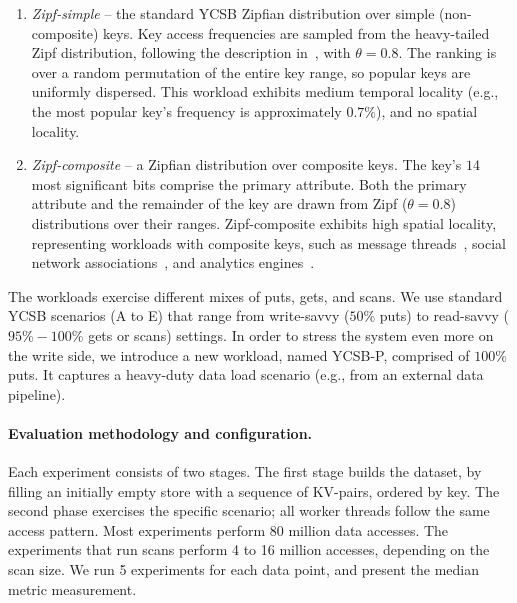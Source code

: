 \begin{enumerate}
\item {\em Zipf-simple} -- the standard YCSB Zipfian distribution over simple (non-composite) keys. 
Key access frequencies are sampled from the heavy-tailed Zipf distribution, 
following the description in~\cite{Gray:1994:QGB:191839.191886}, with $\theta = 0.8$. 
The ranking is over a random permutation of the entire key range, so popular keys are uniformly dispersed.
This workload exhibits 
medium temporal locality (e.g., the most popular key's frequency is approximately $0.7\%$), 
and no spatial locality. 

\item {\em Zipf-composite}  -- a Zipfian distribution over composite keys. 
The key's $14$ most significant bits comprise the primary attribute. Both the primary attribute and 
the remainder of the key are drawn from Zipf ($\theta=0.8$) distributions over their ranges. 
Zipf-composite exhibits high spatial locality, representing workloads 
with composite keys, such as message threads~\cite{Borthakur:2011:AHG:1989323.1989438},
social network associations~\cite{Armstrong:2013:LDB:2463676.2465296}, and analytics engines~\cite{flurry}. 

\end{enumerate}

The workloads exercise different mixes of puts, gets, and scans. We use standard YCSB scenarios 
(A to E) that range from write-savvy ($50\%$ puts) to read-savvy ($95\%-100\%$ gets or scans) settings. 
In order to stress the system even more on the write side, we introduce a new workload, named 
YCSB-P, comprised of $100\%$ puts. It captures a heavy-duty data load scenario (e.g., from an 
external data pipeline). 

\paragraph{Evaluation methodology and configuration.} Each experiment consists of two stages. The first stage builds 
the dataset, by filling an initially empty store with a sequence of KV-pairs, ordered by key. The second 
phase exercises the specific scenario; all worker threads follow the same access pattern. Most experiments 
perform 80 million data accesses. The experiments that run scans perform 4 to 16 million accesses, depending 
on the scan size. We run 5 experiments for each data point, and present the median metric measurement. 

